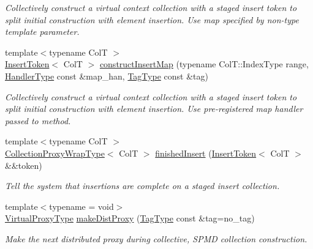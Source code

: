 \begin{DoxyCompactItemize}
\begin{DoxyCompactList}\small\item\em Collectively construct a virtual context collection with a staged insert token to split initial construction with element insertion. Use map specified by non-\/type template parameter. \end{DoxyCompactList}\item 
{\footnotesize template$<$typename ColT $>$ }\\\hyperlink{structvt_1_1vrt_1_1collection_1_1_insert_token}{Insert\+Token}$<$ ColT $>$ \hyperlink{structvt_1_1vrt_1_1collection_1_1_collection_manager_a5fdc620b8c03bf7748802e35cff1afe9}{construct\+Insert\+Map} (typename Col\+T\+::\+Index\+Type range, \hyperlink{namespacevt_af64846b57dfcaf104da3ef6967917573}{Handler\+Type} const \&map\+\_\+han, \hyperlink{namespacevt_a84ab281dae04a52a4b243d6bf62d0e52}{Tag\+Type} const \&tag)
\begin{DoxyCompactList}\small\item\em Collectively construct a virtual context collection with a staged insert token to split initial construction with element insertion. Use pre-\/registered map handler passed to method. \end{DoxyCompactList}\item 
{\footnotesize template$<$typename ColT $>$ }\\\hyperlink{structvt_1_1vrt_1_1collection_1_1_collection_manager_a56458ed7f9bb22b631b9b3a745f42f94}{Collection\+Proxy\+Wrap\+Type}$<$ ColT $>$ \hyperlink{structvt_1_1vrt_1_1collection_1_1_collection_manager_a9275a4f6a7c33389813ba7fe4cc75d7e}{finished\+Insert} (\hyperlink{structvt_1_1vrt_1_1collection_1_1_insert_token}{Insert\+Token}$<$ ColT $>$ \&\&token)
\begin{DoxyCompactList}\small\item\em Tell the system that insertions are complete on a staged insert collection. \end{DoxyCompactList}\item 
{\footnotesize template$<$typename  = void$>$ }\\\hyperlink{namespacevt_a1b417dd5d684f045bb58a0ede70045ac}{Virtual\+Proxy\+Type} \hyperlink{structvt_1_1vrt_1_1collection_1_1_collection_manager_a1f18abc7b511cce4d07ba011c91d21df}{make\+Dist\+Proxy} (\hyperlink{namespacevt_a84ab281dae04a52a4b243d6bf62d0e52}{Tag\+Type} const \&tag=no\+\_\+tag)
\begin{DoxyCompactList}\small\item\em Make the next distributed proxy during collective, S\+P\+MD collection construction. \end{DoxyCompactList}\item 

\end{DoxyCompactItemize}
